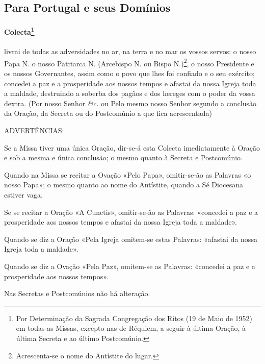 \subsection{Para Portugal e seus Domínios}\label{portugaldominios}

\paragraph{Colecta\footnote{Por Determinação da Sagrada Congregação dos Ritos (19 de Maio de 1952) em todas as Missas, excepto nas de Réquiem, a seguir à última Oração, à última Secreta e ao último Postcomúnio.}}

 livrai de todas as adversidades no ar, na terra e no mar os vossos servos: o nosso Papa {\redx N.} o nosso Patriarca {\redx N.} (Arcebispo {\redx N.} ou Bispo {\redx N.})\footnote{Acrescenta-se o nome do Antístite do lugar.}, o nosso Presidente e os nossos Governantes, assim como o povo que lhes foi confiado e o seu exército; concedei a paz e a prosperidade aos nossos tempos e afastai da nossa Igreja toda a maldade, destruindo a soberba dos pagãos e dos hereges com o poder da vossa dextra. (Por nosso Senhor \emph{\&c.} ou Pelo mesmo nosso Senhor segundo a conclusão da Oração, da Secreta ou do Postcomúnio a que fica acrescentada)

ADVERTÊNCIAS:
\begin{compactitem}
\item Se a Missa tiver uma única Oração, dir-se-á esta Colecta imediatamente à Oração e sob a mesma e única conclusão; o mesmo quanto à Secreta e Postcomúnio.
\item Quando na Missa se recitar a Ovação «Pelo Papa», omitir-se-ão as Palavras «o nosso Papa»; o mesmo quanto ao nome do Antístite, quando a Sé Diocesana estiver vaga.
\item Se se recitar a Oração «A Cunctis», omitir-se-ão as Palavras: «concedei a paz e a prosperidade aos nossos tempos e afastai da nossa Igreja toda a maldade».
\item Quando se diz a Oração «Pela Igreja omitem-se estas Palavras: «afastai da nossa Igreja toda a maldade».
\item Quando se diz a Ovação «Pela Paz», omitem-se as Palavras: «concedei a paz e a prosperidade aos nossos tempos».
\item Nas Secretas e Postcomúnios não há alteração.
\end{compactitem}
